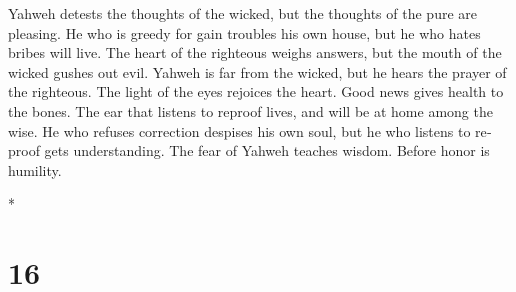 \begin{paracol}{2}
\begin{otherlanguage}{english}
 Yahweh detests the thoughts of the wicked, but the
thoughts of the pure are pleasing.  He who is greedy for
gain troubles his own house, but he who hates bribes will live.
 The heart of the righteous weighs answers, but the mouth
of the wicked gushes out evil.  Yahweh is far from the
wicked, but he hears the prayer of the righteous.  The
light of the eyes rejoices the heart. Good news gives health to the
bones.  The ear that listens to reproof lives, and will
be at home among the wise.  He who refuses correction
despises his own soul, but he who listens to reproof gets understanding.
 The fear of Yahweh teaches wisdom. Before honor is
humility.

\end{otherlanguage}

\switchcolumn[0]*

\hypertarget{section-30}{%
\section{16}\label{section-30}}


\end{paracol}
